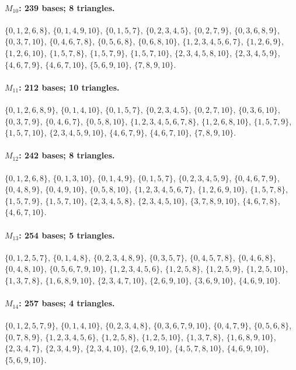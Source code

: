 \paragraph{$M_{10}$: 239 bases; 8 triangles.}
\(\{0,1,2,6,8\}\), \(\{0,1,4,9,10\}\), \(\{0,1,5,7\}\), \(\{0,2,3,4,5\}\), \(\{0,2,7,9\}\), \(\{0,3,6,8,9\}\), \(\{0,3,7,10\}\), \(\{0,4,6,7,8\}\), \(\{0,5,6,8\}\), \(\{0,6,8,10\}\), \(\{1,2,3,4,5,6,7\}\), \(\{1,2,6,9\}\), \(\{1,2,6,10\}\), \(\{1,5,7,8\}\), \(\{1,5,7,9\}\), \(\{1,5,7,10\}\), \(\{2,3,4,5,8,10\}\), \(\{2,3,4,5,9\}\), \(\{4,6,7,9\}\), \(\{4,6,7,10\}\), \(\{5,6,9,10\}\), \(\{7,8,9,10\}\).

\paragraph{$M_{11}$: 212 bases; 10 triangles.}
\(\{0,1,2,6,8,9\}\), \(\{0,1,4,10\}\), \(\{0,1,5,7\}\), \(\{0,2,3,4,5\}\), \(\{0,2,7,10\}\), \(\{0,3,6,10\}\), \(\{0,3,7,9\}\), \(\{0,4,6,7\}\), \(\{0,5,8,10\}\), \(\{1,2,3,4,5,6,7,8\}\), \(\{1,2,6,8,10\}\), \(\{1,5,7,9\}\), \(\{1,5,7,10\}\), \(\{2,3,4,5,9,10\}\), \(\{4,6,7,9\}\), \(\{4,6,7,10\}\), \(\{7,8,9,10\}\).

\paragraph{$M_{12}$: 242 bases; 8 triangles.}
\(\{0,1,2,6,8\}\), \(\{0,1,3,10\}\), \(\{0,1,4,9\}\), \(\{0,1,5,7\}\), \(\{0,2,3,4,5,9\}\), \(\{0,4,6,7,9\}\), \(\{0,4,8,9\}\), \(\{0,4,9,10\}\), \(\{0,5,8,10\}\), \(\{1,2,3,4,5,6,7\}\), \(\{1,2,6,9,10\}\), \(\{1,5,7,8\}\), \(\{1,5,7,9\}\), \(\{1,5,7,10\}\), \(\{2,3,4,5,8\}\), \(\{2,3,4,5,10\}\), \(\{3,7,8,9,10\}\), \(\{4,6,7,8\}\), \(\{4,6,7,10\}\).

\paragraph{$M_{13}$: 254 bases; 5 triangles.}
\(\{0,1,2,5,7\}\), \(\{0,1,4,8\}\), \(\{0,2,3,4,8,9\}\), \(\{0,3,5,7\}\), \(\{0,4,5,7,8\}\), \(\{0,4,6,8\}\), \(\{0,4,8,10\}\), \(\{0,5,6,7,9,10\}\), \(\{1,2,3,4,5,6\}\), \(\{1,2,5,8\}\), \(\{1,2,5,9\}\), \(\{1,2,5,10\}\), \(\{1,3,7,8\}\), \(\{1,6,8,9,10\}\), \(\{2,3,4,7,10\}\), \(\{2,6,9,10\}\), \(\{3,6,9,10\}\), \(\{4,6,9,10\}\).

\paragraph{$M_{14}$: 257 bases; 4 triangles.}
\(\{0,1,2,5,7,9\}\), \(\{0,1,4,10\}\), \(\{0,2,3,4,8\}\), \(\{0,3,6,7,9,10\}\), \(\{0,4,7,9\}\), \(\{0,5,6,8\}\), \(\{0,7,8,9\}\), \(\{1,2,3,4,5,6\}\), \(\{1,2,5,8\}\), \(\{1,2,5,10\}\), \(\{1,3,7,8\}\), \(\{1,6,8,9,10\}\), \(\{2,3,4,7\}\), \(\{2,3,4,9\}\), \(\{2,3,4,10\}\), \(\{2,6,9,10\}\), \(\{4,5,7,8,10\}\), \(\{4,6,9,10\}\), \(\{5,6,9,10\}\).

